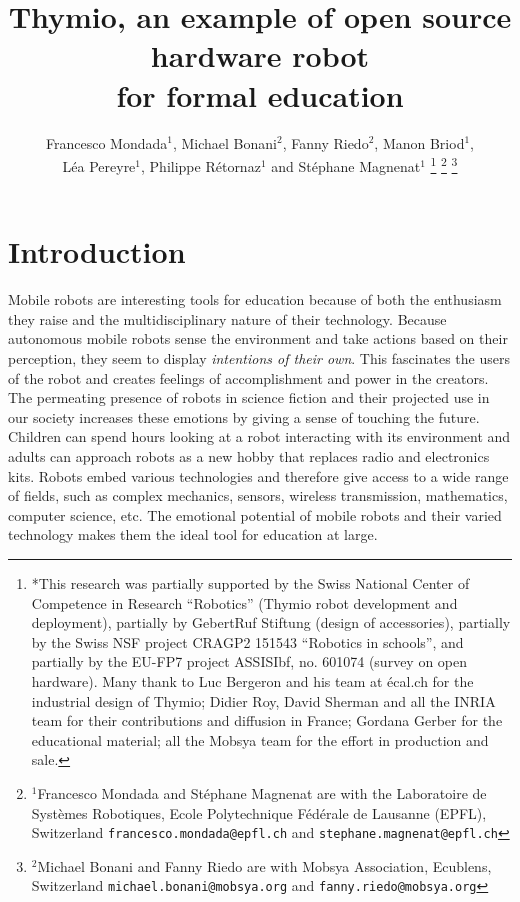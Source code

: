 \documentclass[letterpaper, 10 pt, conference]{ieeeconf}  %
\title{\LARGE \bf
Thymio, an example of open source hardware robot \\
for formal education
}
\author{Francesco Mondada$^{1}$, Michael Bonani$^{2}$, Fanny Riedo$^{2}$, Manon Briod$^{1}$, \\
L\'ea Pereyre$^{1}$, Philippe R\'etornaz$^{1}$ and St\'ephane Magnenat$^{1}$%
\thanks{*This research was partially supported by the Swiss National Center of Competence in Research ``Robotics'' (Thymio robot development and deployment), partially by GebertRuf Stiftung (design of accessories), partially by the Swiss NSF project CRAGP2 151543 ``Robotics in schools'', and partially by the EU-FP7 project ASSISIbf, no. 601074 (survey on open hardware). Many thank to Luc Bergeron and his team at écal.ch for the industrial design of Thymio; Didier Roy, David Sherman and all the INRIA team for their contributions and diffusion in France; Gordana Gerber for the educational material; all the Mobsya team for the effort in production and sale.}%
\thanks{$^{1}$Francesco Mondada and St\'ephane Magnenat are with the Laboratoire de Syst\`emes Robotiques,
        Ecole Polytechnique F\'ed\'erale de Lausanne (EPFL), Switzerland
        {\tt\small francesco.mondada@epfl.ch} and {\tt\small stephane.magnenat@epfl.ch}}%
\thanks{$^{2}$Michael Bonani and Fanny Riedo are with Mobsya Association, Ecublens, Switzerland
        {\tt\small michael.bonani@mobsya.org} and {\tt\small fanny.riedo@mobsya.org}}%
}
\begin{document}
\maketitle
\thispagestyle{empty}
\pagestyle{empty}





\section{Introduction}

Mobile robots are interesting tools for education because of both the enthusiasm they raise and the multidisciplinary nature of their technology.
Because autonomous mobile robots sense the environment and take actions based on their perception, they seem to display \emph{intentions of their own}.
This fascinates the users of the robot and creates feelings of accomplishment and power in the creators.
The permeating presence of robots in science fiction and their projected use in our society increases these emotions by giving a sense of touching the future. %
Children can spend hours looking at a robot interacting with its environment and adults can approach robots as a new hobby that replaces radio and electronics kits.
Robots embed various technologies and therefore give access to a wide range of fields, such as complex mechanics, sensors, wireless transmission, mathematics, computer science, etc.
The emotional potential of mobile robots and their varied technology makes them the ideal tool for education at large.
\end{document}
